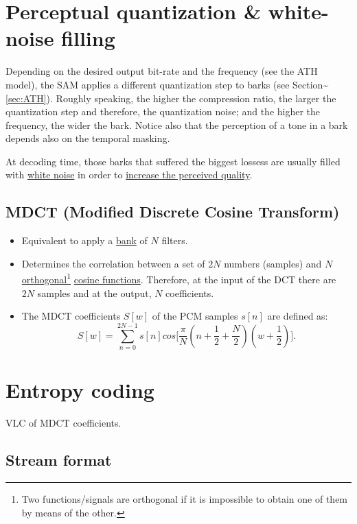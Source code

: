 \section{Perceptual quantization \& white-noise filling}
Depending on the desired output bit-rate and the frequency (see the ATH
model), the SAM applies a different quantization step to barks (see
Section\textasciitilde{}\ref{sec:ATH}). Roughly speaking, the higher the
compression ratio, the larger the quantization step and therefore, the
quantization noise; and the higher the frequency, the wider the bark.
Notice also that the perception of a tone in a bark depends also on the
temporal masking.

At decoding time, those barks that suffered the biggest lossess are
usually filled with
\href{http://en.wikipedia.org/wiki/White_noise}{white noise} in order to
\href{http://simplynoise.com/}{increase the perceived
    quality}.

\subsection{MDCT (Modified Discrete Cosine Transform)}
\begin{itemize}
\item
  Equivalent to apply a
  \href{http://en.wikipedia.org/wiki/Filter_bank}{bank} of \(N\)
  filters.
\item
  Determines the correlation between a set of \(2N\) numbers (samples)
  and \(N\)
  \href{http://en.wikipedia.org/wiki/Orthogonality}{orthogonal}\footnote{Two
    functions/signals are orthogonal if it is impossible to obtain one
    of them by means of the other.}
  \href{http://guru.multimedia.cx/mdct/}{cosine functions}. Therefore,
  at the input of the DCT there are \(2N\) samples and at the output,
  \(N\) coefficients.
\item
  The MDCT coefficients \(S[w]\) of the PCM samples \(s[n]\) are defined
  as:
   \begin{equation}
    S[w] = \sum_{n=0}^{2N-1}s[n]cos\Big[\frac{\pi}{N}(n+\frac{1}{2}+\frac{N}{2})(w+\frac{1}{2})\Big].
    \label{eq:MDCT}
  \end{equation}
\end{itemize}

\section{Entropy coding}
VLC of MDCT coefficients.

\subsection{Stream format}

